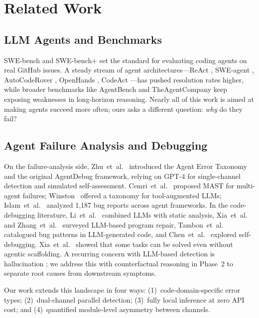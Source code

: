\documentclass{ieeeaccess}
\begin{document}
\section{Related Work}
\label{sec:related}

\subsection{LLM Agents and Benchmarks}

SWE-bench \cite{b1} and SWE-bench+ \cite{b16} set the standard for evaluating coding agents on real GitHub issues. A steady stream of agent architectures---ReAct \cite{b2}, SWE-agent \cite{b3}, AutoCodeRover \cite{b4}, OpenHands \cite{b13}, CodeAct \cite{b14}---has pushed resolution rates higher, while broader benchmarks like AgentBench \cite{b23} and TheAgentCompany \cite{b24} keep exposing weaknesses in long-horizon reasoning. Nearly all of this work is aimed at making agents succeed more often; ours asks a different question: \emph{why} do they fail?

\subsection{Agent Failure Analysis and Debugging}

On the failure-analysis side, Zhu~et~al.\ \cite{b5} introduced the Agent Error Taxonomy and the original AgentDebug framework, relying on GPT-4 for single-channel detection and simulated self-assessment. Cemri~et~al.\ \cite{b6} proposed MAST for multi-agent failures; Winston~\cite{b7} offered a taxonomy for tool-augmented LLMs; Islam~et~al.\ \cite{b15} analyzed 1,187 bug reports across agent frameworks. In the code-debugging literature, Li~et~al.\ \cite{b19} combined LLMs with static analysis, Xia~et~al.\ \cite{b21} and Zhang~et~al.\ \cite{b20} surveyed LLM-based program repair, Tambon~et~al.\ \cite{b25} catalogued bug patterns in LLM-generated code, and Chen~et~al.\ \cite{b8} explored self-debugging. Xia~et~al.\ \cite{b18} showed that some tasks can be solved even without agentic scaffolding. A recurring concern with LLM-based detection is hallucination \cite{b17, b22}; we address this with counterfactual reasoning \cite{b9} in Phase~2 to separate root causes from downstream symptoms.

Our work extends this landscape in four ways: (1)~code-domain-specific error types; (2)~dual-channel parallel detection; (3)~fully local inference at zero API cost; and (4)~quantified module-level asymmetry between channels.
\end{document}
